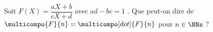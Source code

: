 Soit $F(X) = \dfrac{a X + b}{c X + d}$ avec $ad- bc = 1$ .
Que peut-on dire de $\multicompo{F}{n} = \multicompo[dot]{F}{n}$ pour $n \in \NNs$ ?